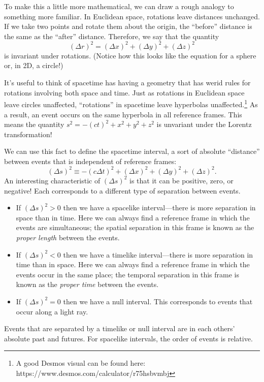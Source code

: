 \documentclass[../p023main.tex]{subfiles}
\begin{document}
To make this a little more mathematical, we can draw a rough analogy to something more familiar.
In Euclidean space, rotations leave distances unchanged.
If we take two points and rotate them about the origin, the ``before'' distance is the same as the ``after'' distance.
Therefore, we say that the quantity
\[ (\Delta r)^2 = (\Delta x)^2 + (\Delta y)^2 + (\Delta z)^2 \]
is invariant under rotations.
(Notice how this looks like the equation for a sphere or, in 2D, a circle!)

It's useful to think of spacetime has having a geometry that has werid rules for rotations involving both space and time.
Just as rotations in Euclidean space leave circles unaffected, ``rotations'' in spacetime leave hyperbolas unaffected.\footnote{A good Desmos visual can be found here: https://www.desmos.com/calculator/r75hsbvmbj}
As a result, an event occurs on the same hyperbola in all reference frames.
This means the quantity $s^2 = -(ct)^2 + x^2 + y^2 + z^2$ is unvariant under the Lorentz transformation!

We can use this fact to define the spacetime interval, a sort of absolute ``distance'' between events that is independent of reference frames:
\[ (\Delta s)^2 \equiv -(c \Delta t)^2 + (\Delta x)^2 + (\Delta y)^2 + (\Delta z)^2. \]
An interesting characteristic of $(\Delta s)^2$ is that it can be positive, zero, or negative!
Each corresponds to a different type of separation between events.
\begin{itemize}
    \item If $(\Delta s)^2 > 0$ then we have a spacelike interval---there is more separation in space than in time.
    Here we can always find a reference frame in which the events are simultaneous; the spatial separation in this frame is known as the \textit{proper length} between the events.
    \item If $(\Delta s)^2 < 0$ then we have a timelike interval---there is more separation in time than in space.
    Here we can always find a reference frame in which the events occur in the same place; the temporal separation in this frame is known as the \textit{proper time} between the events.
    \item If $(\Delta s)^2 = 0$ then we have a null interval.
    This corresponds to events that occur along a light ray.
\end{itemize}
Events that are separated by a timelike or null interval are in each others' absolute past and futures.
For spacelike intervals, the order of events is relative.
\end{document}
